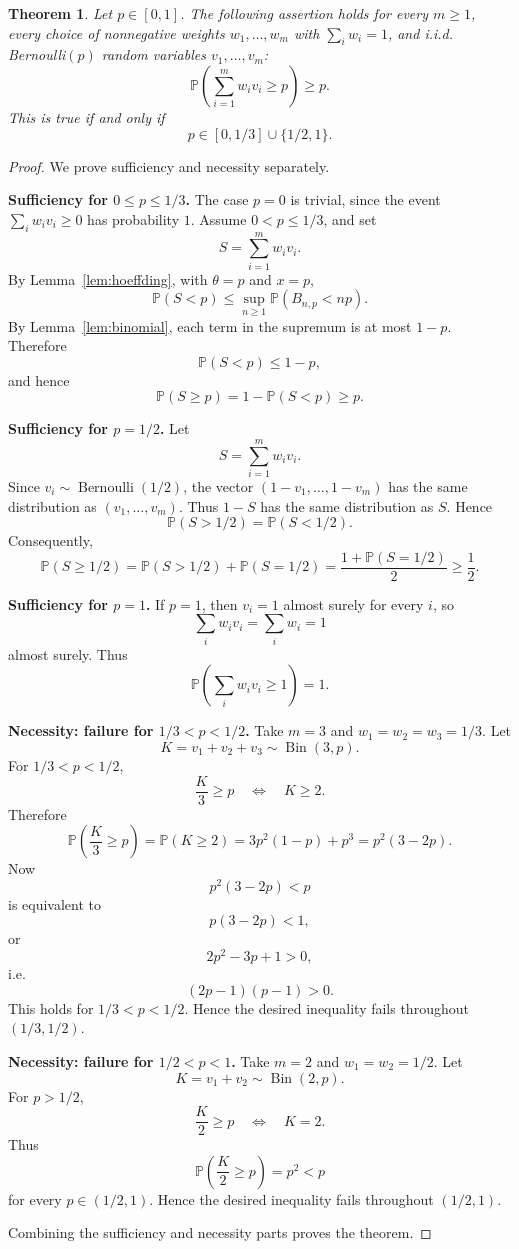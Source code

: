 \documentclass[11pt]{article}
\newtheorem{theorem}{Theorem}
\DeclareMathOperator{\Bin}{Bin}
\begin{document}
\begin{theorem}
\label{thm:main}
Let \(p\in[0,1]\). The following assertion holds for every \(m\ge1\), every
choice of nonnegative weights \(w_1,\ldots,w_m\) with \(\sum_i w_i=1\), and
i.i.d. Bernoulli\((p)\) random variables \(v_1,\ldots,v_m\):
\[
\mathbb P\!\left(\sum_{i=1}^m w_i v_i\ge p\right)\ge p.
\]
This is true if and only if
\[
p\in[0,1/3]\cup\{1/2,1\}.
\]
\end{theorem}

\begin{proof}
We prove sufficiency and necessity separately.

\medskip

\noindent\textbf{Sufficiency for \(0\le p\le 1/3\).}
The case \(p=0\) is trivial, since the event
\(\sum_i w_i v_i\ge0\) has probability \(1\). Assume \(0<p\le1/3\), and set
\[
S=\sum_{i=1}^m w_i v_i .
\]
By Lemma~\ref{lem:hoeffding}, with \(\theta=p\) and \(x=p\),
\[
\mathbb P(S<p)
\le
\sup_{n\ge1}\mathbb P(B_{n,p}<np).
\]
By Lemma~\ref{lem:binomial}, each term in the supremum is at most \(1-p\).
Therefore
\[
\mathbb P(S<p)\le 1-p,
\]
and hence
\[
\mathbb P(S\ge p)=1-\mathbb P(S<p)\ge p.
\]

\medskip

\noindent\textbf{Sufficiency for \(p=1/2\).}
Let
\[
S=\sum_{i=1}^m w_i v_i .
\]
Since \(v_i\sim\operatorname{Bernoulli}(1/2)\), the vector
\((1-v_1,\ldots,1-v_m)\) has the same distribution as
\((v_1,\ldots,v_m)\). Thus \(1-S\) has the same distribution as \(S\). Hence
\[
\mathbb P(S>1/2)=\mathbb P(S<1/2).
\]
Consequently,
\[
\mathbb P(S\ge1/2)
=
\mathbb P(S>1/2)+\mathbb P(S=1/2)
=
\frac{1+\mathbb P(S=1/2)}2
\ge \frac12.
\]

\medskip

\noindent\textbf{Sufficiency for \(p=1\).}
If \(p=1\), then \(v_i=1\) almost surely for every \(i\), so
\[
\sum_i w_i v_i=\sum_i w_i=1
\]
almost surely. Thus
\[
\mathbb P\!\left(\sum_i w_i v_i\ge1\right)=1.
\]

\medskip

\noindent\textbf{Necessity: failure for \(1/3<p<1/2\).}
Take \(m=3\) and \(w_1=w_2=w_3=1/3\). Let
\[
K=v_1+v_2+v_3\sim \Bin(3,p).
\]
For \(1/3<p<1/2\),
\[
\frac K3\ge p
\quad\Longleftrightarrow\quad
K\ge2.
\]
Therefore
\[
\mathbb P\!\left(\frac K3\ge p\right)
=
\mathbb P(K\ge2)
=
3p^2(1-p)+p^3
=
p^2(3-2p).
\]
Now
\[
p^2(3-2p)<p
\]
is equivalent to
\[
p(3-2p)<1,
\]
or
\[
2p^2-3p+1>0,
\]
i.e.
\[
(2p-1)(p-1)>0.
\]
This holds for \(1/3<p<1/2\). Hence the desired inequality fails throughout
\((1/3,1/2)\).

\medskip

\noindent\textbf{Necessity: failure for \(1/2<p<1\).}
Take \(m=2\) and \(w_1=w_2=1/2\). Let
\[
K=v_1+v_2\sim \Bin(2,p).
\]
For \(p>1/2\),
\[
\frac K2\ge p
\quad\Longleftrightarrow\quad
K=2.
\]
Thus
\[
\mathbb P\!\left(\frac K2\ge p\right)=p^2<p
\]
for every \(p\in(1/2,1)\). Hence the desired inequality fails throughout
\((1/2,1)\).

Combining the sufficiency and necessity parts proves the theorem.
\end{proof}
\end{document}
